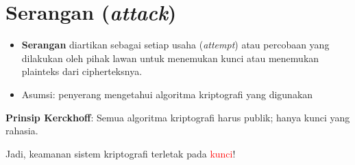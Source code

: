 \documentclass{article}
\begin{document}

\section*{Serangan (\textit{attack})}

\begin{itemize}
    \item \textbf{Serangan} diartikan sebagai setiap usaha (\textit{attempt}) atau percobaan yang dilakukan oleh pihak lawan untuk menemukan kunci atau menemukan plainteks dari cipherteksnya.
    \item Asumsi: penyerang mengetahui algoritma kriptografi yang digunakan
\end{itemize}

\textbf{Prinsip Kerckhoff}: Semua algoritma kriptografi harus publik; hanya kunci yang rahasia.

Jadi, keamanan sistem kriptografi terletak pada \textcolor{red}{kunci}!
\end{document}
